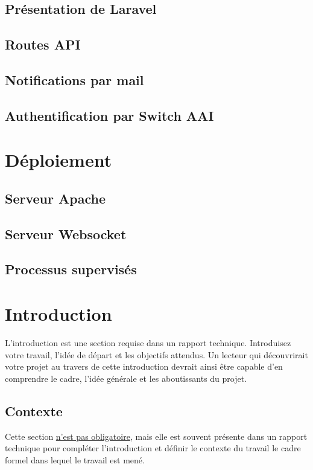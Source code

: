 \documentclass[
    iai, %
    eai, %
]{heig-tb}
\begin{document}
\section{Présentation de Laravel}
\section{Routes API}
\section{Notifications par mail}
\section{Authentification par Switch AAI}

\chapter{Déploiement}
\section{Serveur Apache}
\section{Serveur Websocket}
\section{Processus supervisés}




\chapter{Introduction}
L'introduction est une section requise dans un rapport technique. Introduisez votre travail, l'idée de départ et les objectifs attendus. Un lecteur qui découvrirait votre projet au travers de cette introduction devrait ainsi être capable d'en comprendre le cadre, l'idée générale et les aboutissants du projet.

\section{Contexte}
Cette section \underline{n'est pas obligatoire}, mais elle est souvent présente dans un rapport technique pour compléter l'introduction et définir le contexte du travail \cad le cadre formel dans lequel le travail est mené.
\end{document}
